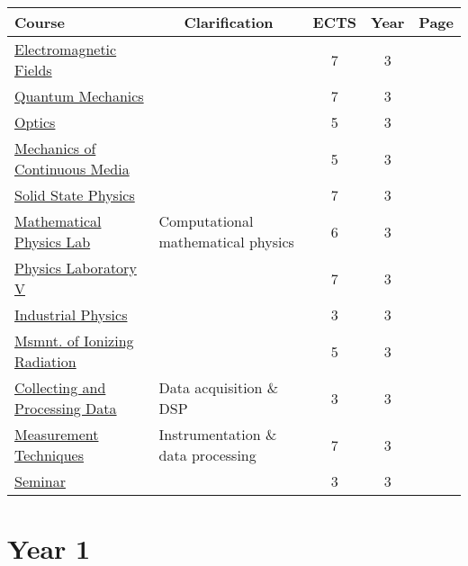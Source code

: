 \documentclass[11pt, a4paper]{article}
\begin{document}
\begin{adjustbox}{center}
\begin{tabular}{|l|l|c|c|c|}
    \textbf{Course} & \multicolumn{1}{c}{\textbf{Clarification}} & \textbf{ECTS} & \textbf{Year} & \textbf{Page}\\
    \hline
    \hline {\rule{0pt}{2.5ex}} \hspace{-7pt}
    \hyperref[electromagnetic_fields]{Electromagnetic Fields} & & 7 & 3 & \pageref{electromagnetic_fields} \\
    \hyperref[quantum_mechanics]{Quantum Mechanics} & & 7 & 3 & \pageref{quantum_mechanics} \\
    \hyperref[optics]{Optics} & & 5 & 3 & \pageref{optics} \\
    \hyperref[mechanics_of_continuous_media]{Mechanics of Continuous Media} & & 5 & 3 & \pageref{mechanics_of_continuous_media} \\
    \hyperref[solid_state_physics]{Solid State Physics} & & 7 & 3 & \pageref{solid_state_physics} \\
    \hyperref[mathematical_physics_lab]{Mathematical Physics Lab} & Computational mathematical physics & 6 & 3 & \pageref{mathematical_physics_lab} \\
    \hyperref[physics_laboratory_5]{Physics Laboratory V} & & 7 & 3 & \pageref{physics_laboratory_5} \\
    \hyperref[industrial_physics]{Industrial Physics} & & 3 & 3 & \pageref{industrial_physics} \\
    \hyperref[measurement_of_ionizing_radiation]{Msmnt. of Ionizing Radiation} & & 5 & 3 & \pageref{measurement_of_ionizing_radiation} \\
    \hyperref[collecting_and_processing_data]{Collecting and Processing Data} & Data acquisition \& DSP & 3 & 3 & \pageref{collecting_and_processing_data} \\
    \hyperref[measurement_techniques]{Measurement Techniques} & Instrumentation \& data processing & 7 & 3 & \pageref{measurement_techniques} \\
    \hyperref[seminar]{Seminar} & & 3 & 3 & \pageref{seminar} \\
    \hline
\end{tabular}
\end{adjustbox}


\newpage
\pagestyle{fancy}
\section{Year 1}
\end{document}
